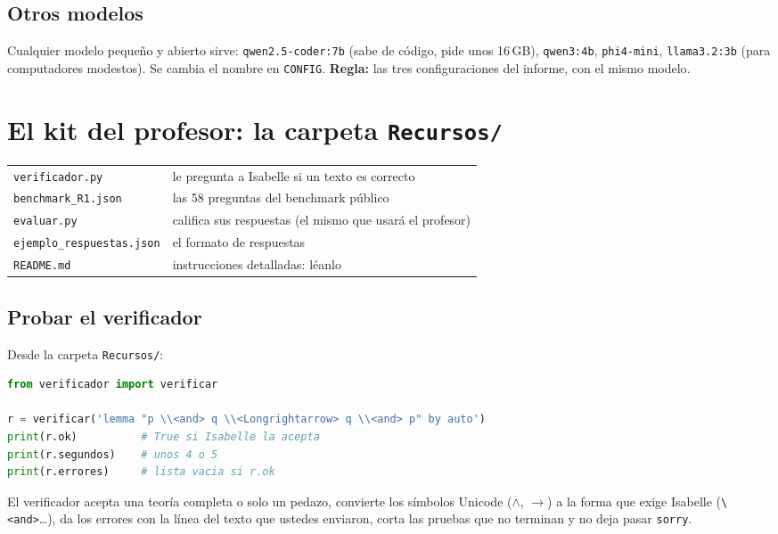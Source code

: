 \documentclass[11pt,a4paper]{article}
\newcommand{\cd}[1]{\texttt{\small #1}}
\begin{document}
\subsection{Otros modelos}
Cualquier modelo pequeño y abierto sirve: \cd{qwen2.5-coder:7b} (sabe de
código, pide unos 16\,GB), \cd{qwen3:4b}, \cd{phi4-mini},
\cd{llama3.2:3b} (para computadores modestos). Se cambia el nombre en
\cd{CONFIG}. \textbf{Regla:} las tres configuraciones del informe, con el
mismo modelo.

\section{El kit del profesor: la carpeta \texttt{Recursos/}}

\begin{center}
\small
\begin{tabular}{@{}ll@{}}
  \toprule
  \cd{verificador.py} & le pregunta a Isabelle si un texto es correcto \\
  \cd{benchmark\_R1.json} & las 58 preguntas del benchmark público \\
  \cd{evaluar.py} & califica sus respuestas (el mismo que usará el profesor) \\
  \cd{ejemplo\_respuestas.json} & el formato de respuestas \\
  \cd{README.md} & instrucciones detalladas: léanlo \\
  \bottomrule
\end{tabular}
\end{center}

\subsection{Probar el verificador}
\begin{haga}
Desde la carpeta \cd{Recursos/}:
\begin{lstlisting}[language=Python]
from verificador import verificar

r = verificar('lemma "p \\<and> q \\<Longrightarrow> q \\<and> p" by auto')
print(r.ok)          # True si Isabelle la acepta
print(r.segundos)    # unos 4 o 5
print(r.errores)     # lista vacia si r.ok
\end{lstlisting}
\end{haga}
El verificador acepta una teoría completa o solo un pedazo, convierte los
símbolos Unicode ($\wedge$, $\longrightarrow$) a la forma que exige
Isabelle (\cd{\textbackslash<and>}\ldots), da los errores con la línea del
texto que ustedes enviaron, corta las pruebas que no terminan y no deja
pasar \cd{sorry}.
\end{document}

